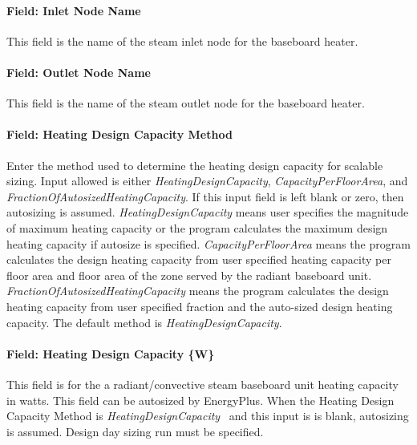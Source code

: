 \paragraph{Field: Inlet Node Name}\label{field-inlet-node-name-1-003}

This field is the name of the steam inlet node for the baseboard heater.

\paragraph{Field: Outlet Node Name}\label{field-outlet-node-name-1-004}

This field is the name of the steam outlet node for the baseboard heater.

\paragraph{Field: Heating Design Capacity Method}\label{field-heating-design-capacity-method-1-000}

Enter the method used to determine the heating design capacity for scalable sizing. Input allowed is either \emph{HeatingDesignCapacity}, \emph{CapacityPerFloorArea}, and \emph{FractionOfAutosizedHeatingCapacity}. If this input field is left blank or zero, then autosizing is assumed. \emph{HeatingDesignCapacity} means user specifies the magnitude of maximum heating capacity or the program calculates the maximum design heating capacity if autosize is specified. \emph{CapacityPerFloorArea} means the program calculates the design heating capacity from user specified heating capacity per floor area and floor area of the zone served by the radiant baseboard unit. \emph{FractionOfAutosizedHeatingCapacity} means the program calculates the design heating capacity from user specified fraction and the auto-sized design heating capacity. The default method is \emph{HeatingDesignCapacity}.

\paragraph{Field: Heating Design Capacity \{W\}}\label{field-heating-design-capacity-w-1-000}

This field is for the a radiant/convective steam baseboard unit heating capacity in watts. This field can be autosized by EnergyPlus. When the Heating Design Capacity Method is \emph{HeatingDesignCapacity}~ and this input is is blank, autosizing is assumed. Design day sizing run must be specified.

